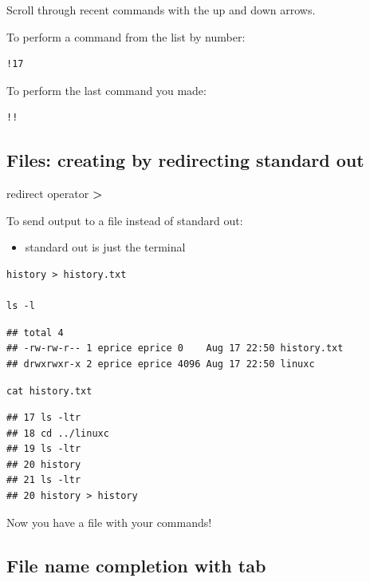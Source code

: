 \documentclass[
]{book}
\providecommand{\tightlist}{%
  \setlength{\itemsep}{0pt}\setlength{\parskip}{0pt}}
\begin{document}
Scroll through recent commands with the up and down arrows.

To perform a command from the list by number:

\begin{verbatim}
!17
\end{verbatim}

To perform the last command you made:

\begin{verbatim}
!!
\end{verbatim}

\hypertarget{files-creating-by-redirecting-standard-out}{%
\subsection{Files: creating by redirecting standard out}\label{files-creating-by-redirecting-standard-out}}

redirect operator \textbf{\textgreater{}}

To send output to a file instead of standard out:

\begin{itemize}
\tightlist
\item
  standard out is just the terminal
\end{itemize}

\begin{verbatim}
history > history.txt

ls -l
\end{verbatim}

\begin{verbatim}
## total 4
## -rw-rw-r-- 1 eprice eprice 0    Aug 17 22:50 history.txt
## drwxrwxr-x 2 eprice eprice 4096 Aug 17 22:50 linuxc
\end{verbatim}

\begin{verbatim}
cat history.txt
\end{verbatim}

\begin{verbatim}
## 17 ls -ltr
## 18 cd ../linuxc
## 19 ls -ltr
## 20 history
## 21 ls -ltr
## 20 history > history
\end{verbatim}

Now you have a file with your commands!

\hypertarget{file-name-completion-with-tab}{%
\subsection{File name completion with tab}\label{file-name-completion-with-tab}}
\end{document}
